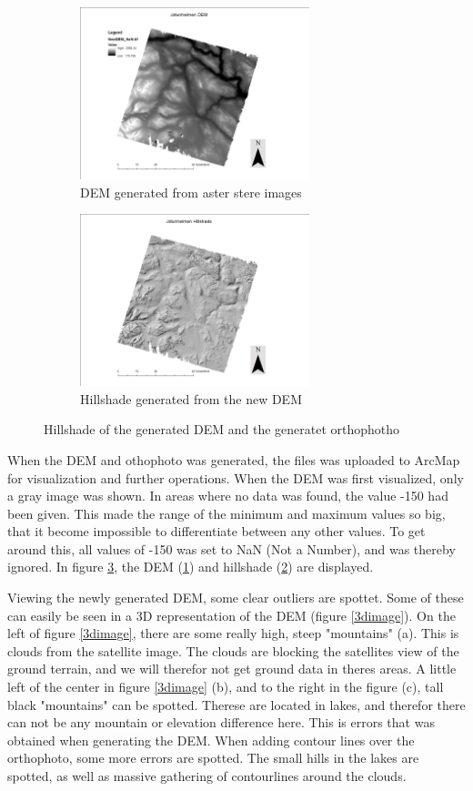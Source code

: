 \documentclass[a4paper,UKenglish]{article}
\begin{document}
\begin{figure}
	\begin{subfigure}{.5\textwidth}
		  \centering
		  \includegraphics[height=5cm]{DEM_NAN}
		  \caption{DEM generated from aster stere images}
		  \label{dem}
	\end{subfigure}%
	\begin{subfigure}{.5\textwidth}
		  \centering
		  \includegraphics[height=5cm]{hillshade}
		  \caption{Hillshade generated from the new DEM}
		  \label{hillshade}
	\end{subfigure}
	\caption{Hillshade of the generated DEM and the generatet orthophotho}
	\label{hilldem}
\end{figure}

When the DEM and othophoto was generated, the files was uploaded to ArcMap for visualization and further operations. When the DEM was first visualized, only a gray image was shown. In areas where no data was found, the value -150 had been given. This made the range of the minimum and maximum values so big, that it become impossible to differentiate between any other values. To get around this, all values of -150 was set to NaN (Not a Number), and was thereby ignored.
In figure \ref{hilldem}, the DEM (\ref{dem}) and hillshade (\ref{hillshade}) are displayed. 

Viewing the newly generated DEM, some clear outliers are spottet. Some of these can easily be seen in a 3D representation of the DEM (figure \ref{3dimage}). On the left of figure \ref{3dimage}, there are some really high, steep "mountains" (a). This is clouds from the satellite image. The clouds are blocking the satellites view of the ground terrain, and we will therefor not get ground data in theres areas. A little left of the center in figure \ref{3dimage} (b), and to the right in the figure (c), tall black "mountains" can be spotted. Therese are located in lakes, and therefor there can not be any mountain or elevation difference here. This is errors that was obtained when generating the DEM. When adding contour lines over the orthophoto, some more errors are spotted. The small hills in the lakes are spotted, as well as massive gathering of contourlines around the clouds.
\end{document}
